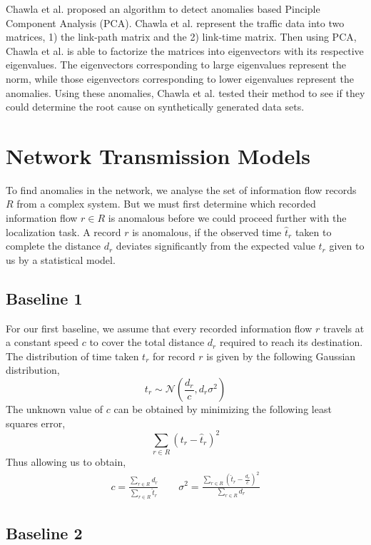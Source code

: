 \documentclass{sig-alternate}
\begin{document}
Chawla et al. \cite{Chawla2012} proposed an algorithm to detect anomalies based Pinciple Component Analysis (PCA). Chawla et al. \cite{Chawla2012} represent the traffic data into two matrices, 1) the link-path matrix and the 2) link-time matrix. Then using PCA, Chawla et al. \cite{Chawla2012} is able to factorize the matrices into eigenvectors with its respective eigenvalues. The eigenvectors corresponding to large eigenvalues represent the norm, while those eigenvectors corresponding to lower eigenvalues represent the anomalies. Using these anomalies, Chawla et al. \cite{Chawla2012} tested their method to see if they could determine the root cause on synthetically generated data sets.

\section{Network Transmission Models}
\label{sec:model}

To find anomalies in the network, we analyse the set of information flow records $R$ from a complex system. But we must first determine which recorded information flow $r \in R$ is anomalous before we could proceed further with the localization task. A record $r$ is anomalous, if the observed time $\hat{t}_r$ taken to complete the distance $d_r$ deviates significantly from the expected value $t_r$ given to us by a statistical model.

\subsection{Baseline 1}

For our first baseline, we assume that every recorded information flow $r$ travels at a constant speed $c$ to cover the total distance $d_r$ required to reach its destination. The distribution of time taken $t_r$ for record $r$ is given by the following Gaussian distribution,
\[ t_r \sim \mathcal{N} \left( \frac{d_r}{c}, d_r \sigma^2 \right) \]
The unknown value of $c$ can be obtained by minimizing the following least squares error,
\[ \sum_{r \in R} (t_r - \hat{t}_r)^2 \]
Thus allowing us to obtain,
\begin{gather*}
	c = \frac{\sum_{r \in R} d_r}{\sum_{r \in R} \hat{t}_r} \qquad
    \sigma^2 = \frac{ \sum_{r \in R} \left( \hat{t}_r - \frac{d_r}{c} \right)^2 }{ \sum_{r \in R} d_r }
\end{gather*}

\subsection{Baseline 2}
\end{document}
